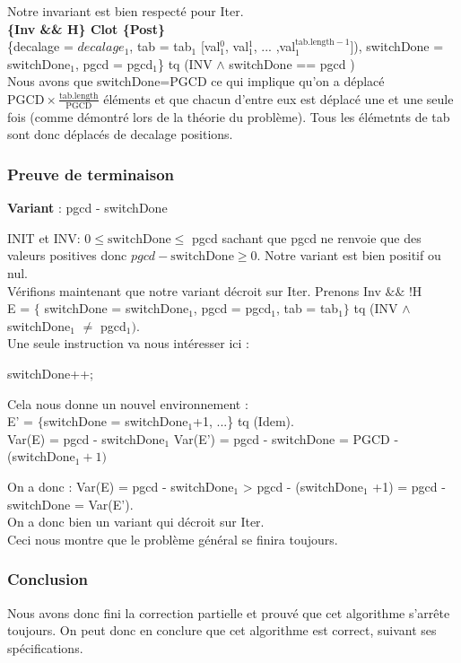 Notre invariant est bien respecté pour Iter.\\

\textbf{\{Inv \&\& H\} Clot \{Post\}}\\
\{decalage = $decalage_{1}$, tab = tab$_{1}$ [val$_{1}^{0}$, val$_{1}^{1}$, ... ,val$_{1}^{\mathrm{tab.length-1}}$]), switchDone = switchDone$_{1}$, pgcd = pgcd$_{1}$\} tq (INV $\wedge$ switchDone == pgcd )\\

 Nous avons que switchDone=PGCD ce qui implique qu'on a déplacé
$\mathrm{PGCD}\times \frac{\mathrm{tab.length}}{\mathrm{PGCD}}$ éléments et
que chacun d'entre eux est déplacé une et une seule fois (comme démontré lors de la théorie du problème). Tous les élémetnts de tab sont donc déplacés de \og decalage \fg{}  positions. 

\subsubsection*{Preuve de terminaison}

\textbf{Variant}  : pgcd - switchDone

INIT et INV:  $0 \leq \mathrm{switchDone} \leq$ pgcd sachant que pgcd ne renvoie que des valeurs positives donc $pgcd - \mathrm{switchDone} \geq 0$. Notre variant est bien positif ou nul.\\ 

Vérifions maintenant que notre variant décroit sur Iter. Prenons Inv $\&\&$ !H \\

E = $\{$ switchDone = switchDone$_{1}$, pgcd = pgcd$_{1}$, tab = tab$_{1}\}$ tq (INV $\wedge$ switchDone$_{1}$ $\neq$ pgcd$_{1})$.\\

Une seule instruction va nous intéresser ici : 

\begin{center}
  switchDone++;\\
\end{center} 
 
Cela nous donne un nouvel environnement :\\

E' = $\{$switchDone = switchDone$_{1}$+1, ...\} tq (Idem).\\

Var(E) = pgcd - switchDone$_{1}$
Var(E') = pgcd - switchDone = PGCD - (switchDone$_{1}+1)$

On a donc : Var(E) = pgcd - switchDone$_{1}$ > pgcd - (switchDone$_1$ +1) = pgcd - switchDone = Var(E').\\

On a donc bien un variant qui décroit sur Iter.\\

Ceci nous montre que le problème général se finira toujours. 

\subsubsection*{Conclusion}

Nous avons donc fini la correction partielle et prouvé que cet algorithme s'arrête toujours. On peut donc en conclure que cet algorithme est correct, suivant ses spécifications. 
